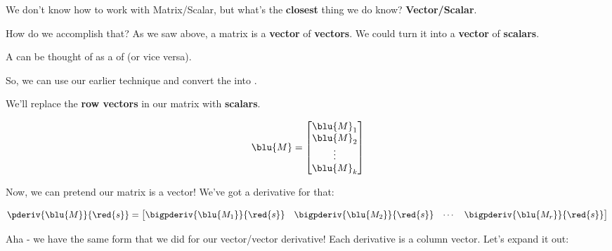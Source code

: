         We don't know how to work with Matrix/Scalar, but what's the \textbf{closest} thing we do know? \textbf{Vector/Scalar}.
        
        How do we accomplish that? As we saw above, a matrix is a \textbf{vector} of \textbf{vectors}. We could turn it into a \textbf{vector} of \textbf{scalars}.\\
        
        \begin{concept}
            A  can be thought of as a  of  (or vice versa).
            
            So, we can use our earlier technique and convert the  into .
        \end{concept}
        
        We'll replace the \textbf{row vectors} in our matrix with \textbf{scalars}. 
        
        \begin{equation}
            \blu{M}
            =
            \begin{bmatrix}
                \blu{M}_1 \\ \blu{M}_2 \\ \vdots \\ \blu{M}_k
            \end{bmatrix}
        \end{equation}
    
        Now, we can pretend our matrix is a vector! We've got a derivative for that:
        
        \begin{equation}
            \pderiv{ \blu{M} }{ \red{s} } 
            =
            \begin{bmatrix}
                \bigpderiv{ \blu{M_1} }{ \red{s} } &
                \bigpderiv{ \blu{M_2} }{ \red{s} } &
                \cdots &
                \bigpderiv{ \blu{M_r} }{ \red{s} } 
            \end{bmatrix}
        \end{equation}
        
        Aha - we have the same form that we did for our vector/vector derivative! Each derivative is a column vector. Let's expand it out:
        

